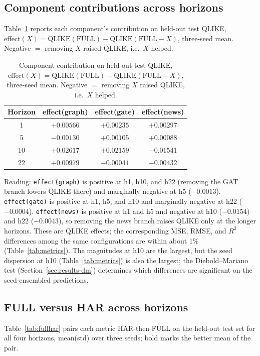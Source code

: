 \documentclass[runningheads]{llncs}
\begin{document}
\subsection{Component contributions across horizons}
\label{sec:results-effects}
Table~\ref{tab:effects} reports each component's contribution on held-out test QLIKE,
$\text{effect}(X)=\text{QLIKE}(\text{FULL})-\text{QLIKE}(\text{FULL}{-}X)$, three-seed mean. Negative $=$
removing $X$ raised QLIKE, i.e.\ $X$ helped.

\begin{table}[t]
\caption{Component contribution on held-out test QLIKE,
$\text{effect}(X)=\text{QLIKE}(\text{FULL})-\text{QLIKE}(\text{FULL}{-}X)$, three-seed mean. Negative $=$
removing $X$ raised QLIKE, i.e.\ $X$ helped.}
\label{tab:effects}
\centering
\begin{tabular}{cccc}
\toprule
Horizon & effect(graph) & effect(gate) & effect(news) \\
\midrule
1  & $+0.00566$ & $+0.00235$ & $+0.00297$ \\
5  & $-0.00130$ & $+0.00105$ & $+0.00088$ \\
10 & $+0.02617$ & $+0.02159$ & $-0.01541$ \\
22 & $+0.00979$ & $-0.00041$ & $-0.00432$ \\
\bottomrule
\end{tabular}
\end{table}

Reading: \texttt{effect(graph)} is positive at h1, h10, and h22 (removing the GAT branch lowers QLIKE
there) and marginally negative at h5 ($-0.0013$). \texttt{effect(gate)} is positive at h1, h5, and h10 and
marginally negative at h22 ($-0.0004$). \texttt{effect(news)} is positive at h1 and h5 and negative at h10
($-0.0154$) and h22 ($-0.0043$), so removing the news branch raises QLIKE only at the longer horizons.
These are QLIKE effects; the corresponding MSE, RMSE, and $R^2$ differences among the same configurations
are within about 1\% (Table~\ref{tab:metrics}). The magnitudes at h10 are the largest, but the seed
dispersion at h10 (Table~\ref{tab:metrics}) is also the largest; the Diebold--Mariano test
(Section~\ref{sec:results-dm}) determines which differences are significant on the seed-ensembled
predictions.

\subsection{FULL versus HAR across horizons}
\label{sec:results-fullhar}
Table~\ref{tab:fullhar} pairs each metric HAR-then-FULL on the held-out test set for all four horizons,
mean(std) over three seeds; bold marks the better mean of the pair.
\end{document}

